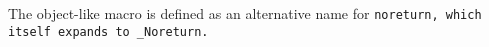 The object-like macro  is defined as an alternative
name for \tt{noreturn}, which itself expands to \tt{_Noreturn}.
